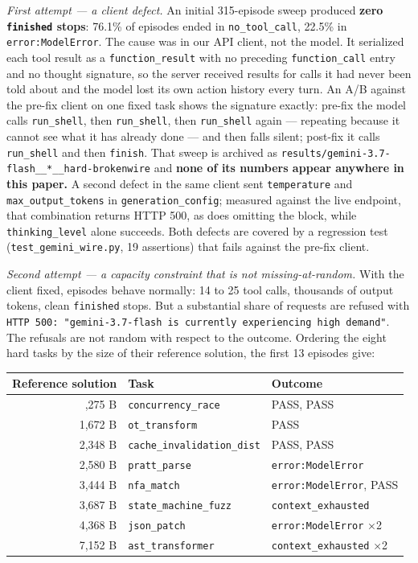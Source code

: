 \documentclass[
  10pt,
  a4paper,
]{article}
\newcounter{none} %
\let\oldtexttt\texttt
\renewcommand{\texttt}[1]{{\small\oldtexttt{#1}}}
\begin{document}
\emph{First attempt --- a client defect.} An initial 315-episode sweep
produced \textbf{zero \texttt{finished} stops}: 76.1\% of episodes ended
in \texttt{no\_tool\_call}, 22.5\% in \texttt{error:ModelError}. The
cause was in our API client, not the model. It serialized each tool
result as a \texttt{function\_result} with no preceding
\texttt{function\_call} entry and no thought signature, so the server
received results for calls it had never been told about and the model
lost its own action history every turn. An A/B against the pre-fix
client on one fixed task shows the signature exactly: pre-fix the model
calls \texttt{run\_shell}, then \texttt{run\_shell}, then
\texttt{run\_shell} again --- repeating because it cannot see what it
has already done --- and then falls silent; post-fix it calls
\texttt{run\_shell} and then \texttt{finish}. That sweep is archived as
\texttt{results/gemini-3.7-flash\_\_*\_\_hard-brokenwire} and
\textbf{none of its numbers appear anywhere in this paper.} A second
defect in the same client sent \texttt{temperature} and
\texttt{max\_output\_tokens} in \texttt{generation\_config}; measured
against the live endpoint, that combination returns HTTP 500, as does
omitting the block, while \texttt{thinking\_level} alone succeeds. Both
defects are covered by a regression test
(\texttt{test\_gemini\_wire.py}, 19 assertions) that fails against the
pre-fix client.

\emph{Second attempt --- a capacity constraint that is not
missing-at-random.} With the client fixed, episodes behave normally: 14
to 25 tool calls, thousands of output tokens, clean \texttt{finished}
stops. But a substantial share of requests are refused with
\texttt{HTTP\ 500:\ "gemini-3.7-flash\ is\ currently\ experiencing\ high\ demand"}.
The refusals are not random with respect to the outcome. Ordering the
eight hard tasks by the size of their reference solution, the first 13
episodes give:

{\def\LTcaptype{none} %
\begin{longtable}[]{@{}rll@{}}
\toprule\noalign{}
Reference solution & Task & Outcome \\
\midrule\noalign{}
\endhead
\bottomrule\noalign{}
\endlastfoot
1,275 B & \texttt{concurrency\_race} & PASS, PASS \\
1,672 B & \texttt{ot\_transform} & PASS \\
2,348 B & \texttt{cache\_invalidation\_dist} & PASS, PASS \\
2,580 B & \texttt{pratt\_parse} & \texttt{error:ModelError} \\
3,444 B & \texttt{nfa\_match} & \texttt{error:ModelError}, PASS \\
3,687 B & \texttt{state\_machine\_fuzz} & \texttt{context\_exhausted} \\
4,368 B & \texttt{json\_patch} & \texttt{error:ModelError} ×2 \\
7,152 B & \texttt{ast\_transformer} & \texttt{context\_exhausted} ×2 \\
\end{longtable}
}
\end{document}
